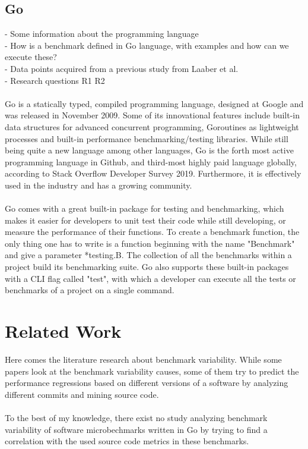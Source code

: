 \documentclass{seal_thesis}
\begin{document}
\subsection{Go}
- Some information about the programming language \\
- How is a benchmark defined in Go language, with examples and how can we execute these? \\
- Data points acquired from a previous study from Laaber et al. \\
- Research questions R1 R2  \\
\\
Go is a statically typed, compiled programming language, designed at Google and was released in November 2009. Some of its innovational features include built-in data structures for advanced concurrent programming, Goroutines as lightweight processes and built-in performance benchmarking/testing libraries. While still being quite a new language among other languages, Go is the forth most active programming language in Github, and third-most highly paid language globally, according to Stack Overflow Developer Survey 2019. Furthermore, it is effectively used in the industry and has a growing community.\\
\\
Go comes with a great built-in package for testing and benchmarking, which makes it easier for developers to unit test their code while still developing, or measure the performance of their functions. To create a benchmark function, the only thing one has to write is a function beginning with the name "Benchmark" and give a parameter *testing.B. The collection of all the benchmarks within a project build its benchmarking suite. Go also supports these built-in packages with a CLI flag called "test", with which a developer can execute all the tests or benchmarks of a project on a single command.


\section{Related Work}
Here comes the literature research about benchmark variability. While some papers look at the benchmark variability causes, some of them try to predict the performance regressions based on different versions of a software by analyzing different commits and mining source code. \\
\\
To the best of my knowledge, there exist no study analyzing benchmark variability of software microbechmarks written in Go by trying to find a correlation with the used source code metrics in these benchmarks.\\
\\
\cite{Laaber:2018:EOS:3196398.3196407}
\end{document}
